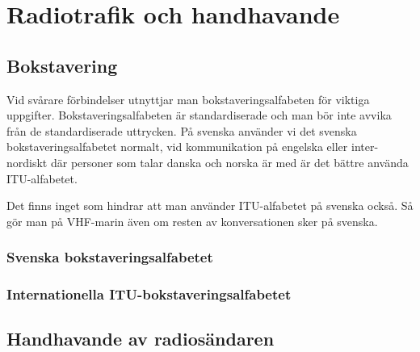 \documentclass[12ypt,swedish,a4paper]{report}
\begin{document}
\tableofcontents

\setlength{\parskip}{1em plus 0.3em minus 0.1em}
\setlength{\parindent}{0pt}

\pagestyle{fancy}

\lhead{\nouppercase{\leftmark}}
\chead{}
\rhead{\nouppercase{\rightmark}}

\cfoot{\thepage}

\renewcommand{\headrulewidth}{0.2pt}
\renewcommand{\footrulewidth}{0.2pt}




\chapter{Radiotrafik och handhavande}
\label{kap:radiotrafik}

\section{Bokstavering}

Vid svårare förbindelser utnyttjar man bokstaveringsalfabeten för viktiga uppgifter. Bokstaveringsalfabeten är standardiserade och man bör inte avvika från de standardiserade uttrycken. På svenska använder vi det svenska bokstaveringsalfabetet normalt, vid kommunikation på engelska eller inter-nordiskt där personer som talar danska och norska är med är det bättre använda ITU-alfabetet.

Det finns inget som hindrar att man använder ITU-alfabetet på svenska också. Så gör man på VHF-marin även om resten av konversationen sker på svenska.

\subsection{Svenska bokstaveringsalfabetet}


\subsection{Internationella ITU-bokstaveringsalfabetet}



\section{Handhavande av radiosändaren}
\end{document}
